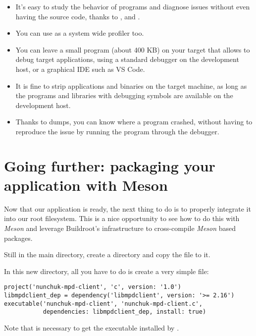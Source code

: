 \begin{itemize}
\item It's easy to study the behavior of programs and diagnose issues
  without even having the source code, thanks to ,
   and .

\item You can use  as a system wide profiler too.

\item You can leave a small  program (about 400 KB) on your target
  that allows to debug target applications, using a standard 
  debugger on the development host, or a graphical IDE such as VS Code.

\item It is fine to strip applications and binaries on the target
  machine, as long as the programs and libraries with debugging
  symbols are available on the development host.

\item Thanks to  dumps, you can know where a program crashed,
  without having to reproduce the issue by running the program through
  the debugger.
\end{itemize}

\section{Going further: packaging your application with Meson}

Now that our application is ready, the next thing to do is to properly
integrate it into our root filesystem. This is a nice opportunity to see
how to do this with {\em Meson} and leverage Buildroot's
infrastructure to cross-compile {\em Meson} based packages.

Still in the main  directory, create a
 directory and copy the
 file to it.

In this new directory, all you have to do is create a very simple
 file:

\begin{verbatim}
project('nunchuk-mpd-client', 'c', version: '1.0')
libmpdclient_dep = dependency('libmpdclient', version: '>= 2.16')
executable('nunchuk-mpd-client', 'nunchuk-mpd-client.c',
           dependencies: libmpdclient_dep, install: true)
\end{verbatim}

Note that  is necessary to get the executable installed
by .

